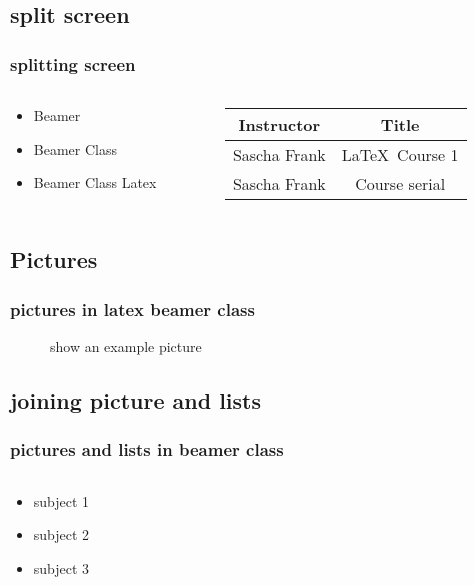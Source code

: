 \subsection{split screen}

\begin{frame}\frametitle{splitting screen}
\begin{columns}
\begin{column}{5cm}
\begin{itemize}
\item Beamer 
\item Beamer Class 
\item Beamer Class Latex 
\end{itemize}
\end{column}
\begin{column}{5cm}
\begin{tabular}{|c|c|}
\hline
\textbf{Instructor} & \textbf{Title} \\
\hline
Sascha Frank &  \LaTeX \ Course 1 \\
\hline
Sascha Frank &  Course serial  \\
\hline
\end{tabular}
\end{column}
\end{columns}
\end{frame}

\subsection{Pictures} 
\begin{frame}\frametitle{pictures in latex beamer class}
\begin{figure}
\caption{show an example picture}
\end{figure}
\end{frame}

\subsection{joining picture and lists} 

\begin{frame}
\frametitle{pictures and lists in beamer class}
\begin{columns}
\begin{column}{5cm}
\begin{itemize}
\item<1-> subject 1
\item<3-> subject 2
\item<5-> subject 3
\end{itemize}
\vspace{3cm} 
\end{column}
\begin{column}{5cm}
\begin{overprint}
\end{overprint}
\end{column}
\end{columns}
\end{frame}


